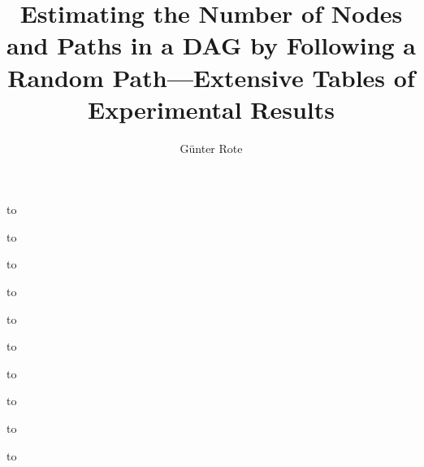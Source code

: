 \documentclass[11pt%
]{article}
\begin{document}
\title{Estimating the Number of Nodes and Paths in a DAG by
Following a Random Path---Extensive Tables of Experimental Results}
\author{Günter Rote}
\maketitle

\newcommand\twotables[1]{
\begin{table}[htb]
  \small
  \centering
  
  \bigskip
  \par 
  \hbox to\linewidth{\hss
     }
}

\twotables{table-PERM-P-all}  
\caption{Algorithm P, Path Sampling, permutations}
\end{table}
\clearpage
\twotables{table-PERM-IS-all }
\caption{IS by outdegree, permutations}
\end{table}
\clearpage
\twotables{table-PERM-BS-all }
\caption{Bucket Sampling, permutations}
\end{table}

\clearpage
\twotables{table-PERM-CS-all }
\caption{Crowd Sampling, permutations, budget $B=10$}
\end{table}

\clearpage
\twotables{table-KM-P-all }
\caption{Algorithm P, Path Sampling, Klee-Minty cubes}
\end{table}

\clearpage
\twotables{table-KM-IS-all }
\caption{IS by outdegree, Klee-Minty cubes}
\end{table}

\clearpage
\twotables{table-KM-IS1-all }
\caption{IS by size, Klee-Minty cubes}
\end{table}

\clearpage
\twotables{table-KM-IS2-all }
\caption{IS by size/indegree, Klee-Minty cubes}
\end{table}

\clearpage
\twotables{table-KM-BS-all}
\caption{Bucket Sampling, Klee-Minty cubes}
\end{table}

\clearpage
\twotables{table-KM-CS-all}
\caption{Crowd Sampling, budget $B=10$, Klee-Minty cubes}
\end{table}
\end{document}
